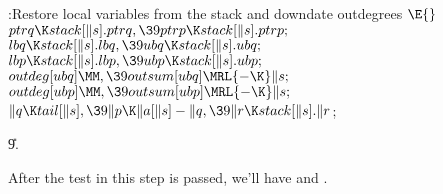 \B{}:Restore local variables from the stack and downdate outdegrees%
\X${}\E{}$\6
$\\{ptrq}\K\\{stack}[\|s].\\{ptrq},\39\\{ptrp}\K\\{stack}[\|s].\\{ptrp};{}$\6
${}\\{lbq}\K\\{stack}[\|s].\\{lbq},\39\\{ubq}\K\\{stack}[\|s].\\{ubq};{}$\6
${}\\{lbp}\K\\{stack}[\|s].\\{lbp},\39\\{ubp}\K\\{stack}[\|s].\\{ubp};{}$\6
${}\\{outdeg}[\\{ubq}]\MM,\39\\{outsum}[\\{ubq}]\MRL{-{\K}}\|s;{}$\6
${}\\{outdeg}[\\{ubp}]\MM,\39\\{outsum}[\\{ubp}]\MRL{-{\K}}\|s;{}$\6
${}\|q\K\\{tail}[\|s],\39\|p\K\|a[\|s]-\|q,\39\|r\K\\{stack}[\|s].\|r{}$;\par
\U9.\fi

After the test in this step is passed, we'll have 
and .

